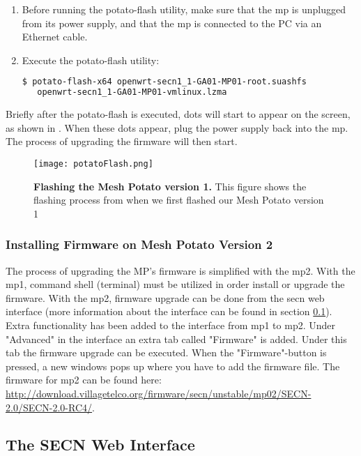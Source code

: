 \begin{enumerate}
\begin{enumerate}
\item Before running the potato-flash utility, make sure that the \gls{mp} is unplugged from its power supply, and that the \gls{mp} is connected to the PC via an Ethernet cable. 

\item Execute the potato-flash utility:
\noindent
\begin{lstlisting}[language=bash]
  $ potato-flash-x64 openwrt-secn1_1-GA01-MP01-root.suashfs 
   openwrt-secn1_1-GA01-MP01-vmlinux.lzma
\end{lstlisting}
\end{enumerate}
\end{enumerate}

Briefly after the potato-flash is executed, dots will start to appear on the screen, as shown in . When these dots appear, plug the power supply back into the \gls{mp}. The process of upgrading the firmware will then start. 

\begin{figure}[b]
  \centering
      \texttt{[image: potatoFlash.png]}
  \caption [Flashing the Mesh Potato version 1]{\textbf{Flashing the Mesh Potato version 1.} This figure shows the flashing process from when we first flashed our Mesh Potato version 1}
  \label{fig:flashing}
\end{figure}


\subsubsection{Installing Firmware on Mesh Potato Version 2}
The process of upgrading the MP's firmware is simplified with the \gls{mp2}. With the \gls{mp1}, command shell (terminal) must be utilized in order install or upgrade the firmware. With the \gls{mp2}, firmware upgrade can be done from the \gls{secn} web interface (more information about the interface can be found in section \ref{subsec:interface}). Extra functionality has been added to the interface from \gls{mp1} to \gls{mp2}. Under "Advanced" in the interface an extra tab called "Firmware" is added. Under this tab the firmware upgrade can be executed. When the "Firmware"-button is pressed, a new windows pops up where you have to add the firmware file. The firmware for \gls{mp2} can be found here: \url{http://download.villagetelco.org/firmware/secn/unstable/mp02/SECN-2.0/SECN-2.0-RC4/}.

\subsection{The SECN Web Interface}
\label{subsec:interface}

